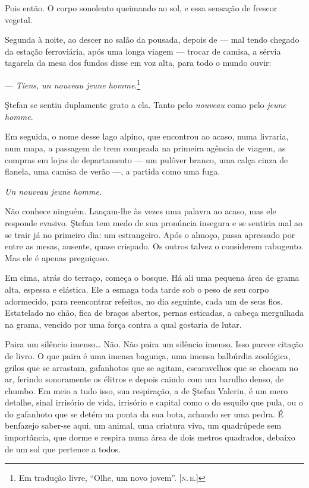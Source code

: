Pois então. O corpo sonolento queimando ao sol, e essa sensação de
frescor vegetal.

Segunda à noite, ao descer no salão da pousada, depois de --- mal tendo
chegado da estação ferroviária, após uma longa viagem --- trocar de
camisa, a sérvia tagarela da mesa dos fundos disse em voz alta, para
todo o mundo ouvir:

--- \emph{Tiens, un nouveau jeune homme}.\footnote{Em tradução livre, ``Olhe, um novo jovem''. \textsc{{[}n.\,e.{]}}}

Ştefan se sentiu duplamente grato a ela. Tanto pelo \emph{nouveau}
como pelo \emph{jeune homme}.


Em seguida, o nome desse lago alpino, que encontrou ao acaso, numa
livraria, num mapa, a passagem de trem comprada na primeira agência de
viagem, as compras em lojas de departamento --- um pulôver branco, uma
calça cinza de flanela, uma camisa de verão ---, a partida como uma
fuga.

\emph{Un nouveau jeune homme.}

\asterisc

Não conhece ninguém. Lançam-lhe às vezes uma palavra ao acaso, mas ele
responde evasivo. Ştefan tem medo de sua pronúncia insegura e se
sentiria mal ao se trair já no primeiro dia: um estrangeiro. Após o
almoço, passa apressado por entre as mesas, ausente, quase crispado. Os
outros talvez o considerem rabugento. Mas ele é apenas preguiçoso.

Em cima, atrás do terraço, começa o bosque. Há ali uma pequena área de
grama alta, espessa e elástica. Ele a esmaga toda tarde sob o peso de
seu corpo adormecido, para reencontrar refeitos, no dia seguinte, cada
um de seus fios. Estatelado no chão, fica de braços abertos, pernas
esticadas, a cabeça mergulhada na grama, vencido por uma força contra a
qual gostaria de lutar.


Paira um silêncio imenso\ldots{} Não. Não paira um silêncio imenso. Isso
parece citação de livro. O que paira é uma imensa bagunça, uma imensa
balbúrdia zoológica, grilos que se arrastam, gafanhotos que se agitam,
escaravelhos que se chocam no ar, ferindo sonoramente os élitros e
depois caindo com um barulho denso, de chumbo. Em meio a tudo isso, sua
respiração, a de Ştefan Valeriu, é um mero detalhe, sinal irrisório de
vida, irrisório e capital como o do esquilo que pula, ou o do gafanhoto
que se detém na ponta da sua bota, achando ser uma pedra. É benfazejo
saber-se aqui, um animal, uma criatura viva, um quadrúpede sem
importância, que dorme e respira numa área de dois metros quadrados,
debaixo de um sol que pertence a todos.

